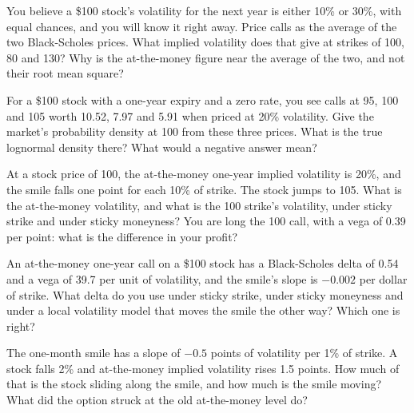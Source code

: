\begin{question}\label{iq:iv2:vol-surface-and-vol-trading:10}
You believe a \$100 stock's volatility for the next year is either 10\% or 30\%, with equal chances, and you will know it right away. Price calls as the average of the two Black-Scholes prices. What implied volatility does that give at strikes of 100, 80 and 130? Why is the at-the-money figure near the average of the two, and not their root mean square?
\end{question}

\begin{question}\label{iq:iv2:vol-surface-and-vol-trading:11}
For a \$100 stock with a one-year expiry and a zero rate, you see calls at 95, 100 and 105 worth 10.52, 7.97 and 5.91 when priced at 20\% volatility. Give the market's probability density at 100 from these three prices. What is the true lognormal density there? What would a negative answer mean?
\end{question}

\begin{question}\label{iq:iv2:vol-surface-and-vol-trading:12}
At a stock price of 100, the at-the-money one-year implied volatility is 20\%, and the smile falls one point for each 10\% of strike. The stock jumps to 105. What is the at-the-money volatility, and what is the 100 strike's volatility, under sticky strike and under sticky moneyness? You are long the 100 call, with a vega of 0.39 per point: what is the difference in your profit?
\end{question}

\begin{question}\label{iq:iv2:vol-surface-and-vol-trading:13}
An at-the-money one-year call on a \$100 stock has a Black-Scholes delta of 0.54 and a vega of 39.7 per unit of volatility, and the smile's slope is $-0.002$ per dollar of strike. What delta do you use under sticky strike, under sticky moneyness and under a local volatility model that moves the smile the other way? Which one is right?
\end{question}

\begin{question}\label{iq:iv2:vol-surface-and-vol-trading:14}
The one-month smile has a slope of $-0.5$ points of volatility per 1\% of strike. A stock falls 2\% and at-the-money implied volatility rises 1.5 points. How much of that is the stock sliding along the smile, and how much is the smile moving? What did the option struck at the old at-the-money level do?
\end{question}

